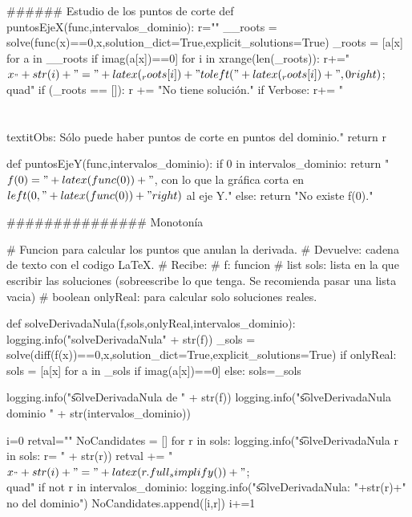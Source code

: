 \begin{sagesilent}
###### Estudio de los puntos de corte
def puntosEjeX(func,intervalos_dominio):
    r=""
    __roots = solve(func(x)==0,x,solution_dict=True,explicit_solutions=True)
    _roots = [a[x] for a in __roots if imag(a[x])==0]
    for i in xrange(len(_roots)):
        r+="$x_"+str(i)+" = "+latex(_roots[i])+"\\to \\left("+latex(_roots[i])+",0\\right)$;\\quad"
    if (_roots == []):
        r += "No tiene solución."
    if Verbose:
        r+= "\\\\\\textit{Obs: Sólo puede haber puntos de corte en puntos del dominio.}"
    return r

def puntosEjeY(func,intervalos_dominio):
    if 0 in intervalos_dominio:
        return "$f(0) = " + latex(func(0)) + "$, con lo que la gráfica corta en $\\left(0,"+latex(func(0)) + "\\right)$ al eje Y."   
    else:
        return  "No existe f(0)."    
    


############### Monotonía

# Funcion para calcular los puntos que anulan la derivada.
# Devuelve: cadena de texto con el codigo LaTeX.
# Recibe:
#   f: funcion
#   list sols: lista en la que escribir las soluciones (sobreescribe lo que tenga. Se recomienda pasar una lista vacia) 
#   boolean onlyReal: para calcular solo soluciones reales.

def solveDerivadaNula(f,sols,onlyReal,intervalos_dominio):
    logging.info("solveDerivadaNula" +  str(f))
    _sols = solve(diff(f(x))==0,x,solution_dict=True,explicit_solutions=True)
    if onlyReal:
        sols = [a[x] for a in _sols if imag(a[x])==0]
    else: 
        sols=_sols



    logging.info("\t solveDerivadaNula de " + str(f))
    logging.info("\t solveDerivadaNula dominio " + str(intervalos_dominio))
        
    i=0
    retval=""
    NoCandidates = []
    for r in sols:
        logging.info("\t solveDerivadaNula r in sols: r= " + str(r))
        retval += "$x_"+str(i)+" = "+latex(r.full_simplify())+"$;\\quad"
        if not r in intervalos_dominio:
            logging.info("\t solveDerivadaNula: "+str(r)+" no del dominio")
            NoCandidates.append([i,r])
        i+=1
    

\end{sagesilent}
